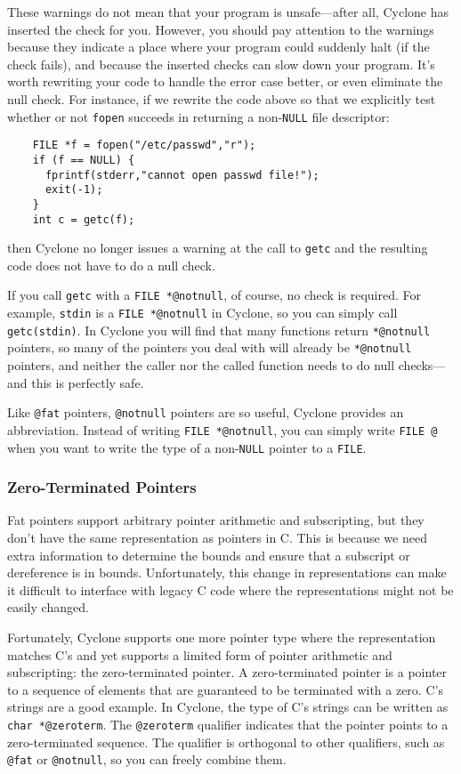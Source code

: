 These warnings do not mean that your program is unsafe---after all,
Cyclone has inserted the check for you.  However, you should pay
attention to the warnings because they indicate a place where your
program could suddenly halt (if the check fails), and because the
inserted checks can slow down your program.  It's worth rewriting your
code to handle the error case better, or even eliminate the null
check.  For instance, if we rewrite the code above so that we
explicitly test whether or not \texttt{fopen} succeeds in returning a
non-\texttt{NULL} file descriptor:
\begin{verbatim}
    FILE *f = fopen("/etc/passwd","r");
    if (f == NULL) {
      fprintf(stderr,"cannot open passwd file!");
      exit(-1);
    }
    int c = getc(f);
\end{verbatim}
then Cyclone no longer issues a warning at the call to \texttt{getc}
and the resulting code does not have to do a null check.

If you call \texttt{getc} with a \texttt{FILE *@notnull}, of course, no check
is required.  For example, \texttt{stdin} is a \texttt{FILE *@notnull} in
Cyclone, so you can simply call \texttt{getc(stdin)}.  In Cyclone you
will find that many functions return \texttt{*@notnull} pointers, so many of
the pointers you deal with will already be \texttt{*@notnull} pointers, and
neither the caller nor the called function needs to do null
checks---and this is perfectly safe.

Like \texttt{@fat} pointers, \texttt{@notnull} pointers are so useful,
Cyclone provides an abbreviation.  Instead of writing \texttt{FILE
*@notnull}, you can simply write \texttt{FILE @} when you want to
write the type of a non-\texttt{NULL} pointer to a \texttt{FILE}.

\subsubsection*{Zero-Terminated Pointers}

Fat pointers support arbitrary pointer arithmetic and subscripting,
but they don't have the same representation as pointers in C.  This
is because we need extra information to determine the bounds and
ensure that a subscript or dereference is in bounds.  Unfortunately,
this change in representations can make it difficult to interface
with legacy C code where the representations might not be easily
changed.  

Fortunately, Cyclone supports one more pointer type where the
representation matches C's and yet supports a limited form of pointer
arithmetic and subscripting: the zero-terminated pointer.  A
zero-terminated pointer is a pointer to a sequence of elements that
are guaranteed to be terminated with a zero.  C's strings are a good
example.  In Cyclone, the type of C's strings can be written as
\texttt{char *@zeroterm}.  The \texttt{@zeroterm} qualifier indicates
that the pointer points to a zero-terminated sequence.  The qualifier
is orthogonal to other qualifiers, such as \texttt{@fat} or
\texttt{@notnull}, so you can freely combine them.

